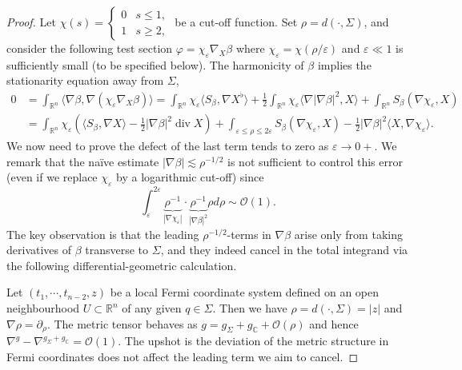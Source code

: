 \documentclass[11pt,a4paper]{article}
\numberwithin{equation}{section}%
\theoremstyle{definition}
\newcommand{\R}{\mathbb{R}}
\newcommand{\C}{\mathbb{C}}
\begin{document}
\begin{proof}
    
    Let $\chi(s)=\left\{\begin{array}{cc}
       0  &  s\leqslant 1,\\
       1  &  s\geqslant 2,
    \end{array}\right.$ be a cut-off function. 
    Set $\rho=d(\cdot,\Sigma)$, and consider the following test section
    $\varphi=\chi_\varepsilon\nabla_X\beta$ where $\chi_\varepsilon=\chi(\rho/\varepsilon)$ and $\varepsilon\ll1 $ is sufficiently small (to be specified below). The harmonicity of $\beta$ implies the stationarity equation away from $\Sigma$,
\begin{equation*}
    \begin{aligned}
        0&=\int_{\R^n} \langle \nabla \beta,\nabla(\chi_\varepsilon \nabla_X\beta)\rangle=\int_{\R^n}\chi_\varepsilon \langle S_\beta,\nabla X^\flat\rangle+\frac{1}{2}\int_{\R^n}\chi_\varepsilon\langle \nabla |\nabla \beta|^2,X\rangle+\int_{\R^n} S_\beta(\nabla \chi_\varepsilon,X)
        \\&=\int_{\R^n} \chi_\varepsilon \left(\langle S_\beta,\nabla X\rangle-\frac{1}{2}|\nabla \beta|^2\operatorname{div}X \right)+\int_{\varepsilon \leqslant\rho\leqslant2\varepsilon}  S_\beta(\nabla \chi_\varepsilon,X)-\frac{1}{2}|\nabla \beta|^2 \langle X,\nabla \chi_\varepsilon\rangle.
    \end{aligned}
\end{equation*}  
 We now need to prove the defect of the last term tends to zero as $\varepsilon\to 0+$. We remark that the na\"ive estimate $|\nabla \beta|\lesssim \rho^{-1/2}$ is not sufficient to control this error (even if we replace $\chi_\varepsilon$ by a logarithmic cut-off)
since 
$$\int_{\varepsilon}^{2\varepsilon} \underbrace{\rho^{-1}}_{|\nabla \chi_\varepsilon|}\cdot \underbrace{\rho^{-1}}_{|\nabla \beta|^2}\rho d\rho\sim \mathcal{O}(1).$$
The key observation is that the leading $\rho^{-1/2}$-terms in $\nabla\beta$ arise only from taking derivatives of $\beta$ transverse to $\Sigma$, and they indeed cancel in the total integrand via the following differential-geometric calculation. 

Let $(t_1,\cdots,t_{n-2},z)$ be a local Fermi coordinate system defined on an open neighbourhood $U\subset \R^n $ of any given $q\in \Sigma$. Then we have $\rho=d(\cdot,\Sigma)=|z|$ and $\nabla\rho=\partial_\rho$. The metric tensor behaves as $g=g_{\Sigma}+g_{\C}+\mathcal{O}(\rho)$ and hence $\nabla^g-\nabla^{g_{\Sigma}+g_\C}=\mathcal{O}(1)$. The upshot is the deviation of the metric structure in Fermi coordinates does not affect the leading term we aim to cancel. 


\end{proof}
\end{document}
